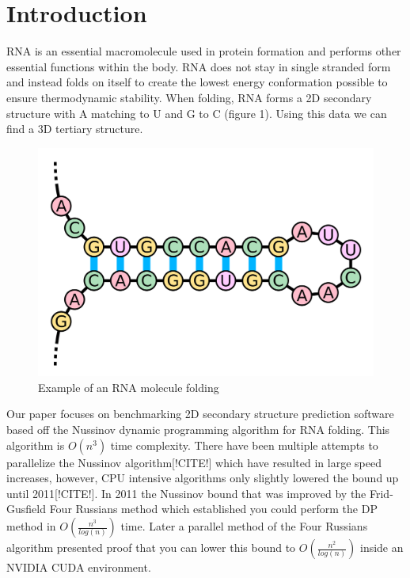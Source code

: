 \documentclass[12pt]{article}
\begin{document}
\section{Introduction}
\par RNA is an essential macromolecule used in protein formation and performs other essential functions within the body\cite{turner}. RNA does not stay in single stranded form and instead folds on itself to create the lowest energy conformation possible to ensure thermodynamic stability\cite{herschlag}. When folding, RNA forms a 2D secondary structure\cite{mccaskill} with A matching to U and G to C (figure 1).  Using this data we can find a 3D tertiary structure\cite{mccaskill}.
\begin{figure}[h!]
  \centering
  \includegraphics[keepaspectratio, scale=0.12]{fold-example.png}
  \caption{Example of an RNA molecule folding}
  \label{fig:RSUencountered}
\end{figure}
\par Our paper focuses on benchmarking 2D secondary structure prediction software based off the Nussinov dynamic programming algorithm\cite{nussinov} for RNA folding. This algorithm is $O(n^3)$ time complexity. There have been multiple attempts to parallelize the Nussinov algorithm[!CITE!] which have resulted in large speed increases, however, CPU intensive algorithms only slightly lowered the bound up until 2011[!CITE!]. In 2011 the Nussinov bound that was improved by the Frid-Gusfield Four Russians method which established you could perform the DP method in $O(\frac{n^3}{log(n)})$ time\cite{gusfield}. Later a parallel method of the Four Russians algorithm presented proof that you can lower this bound to $O(\frac{n^2}{log(n)})$ inside an NVIDIA CUDA environment\cite{balaji}.
\end{document}
